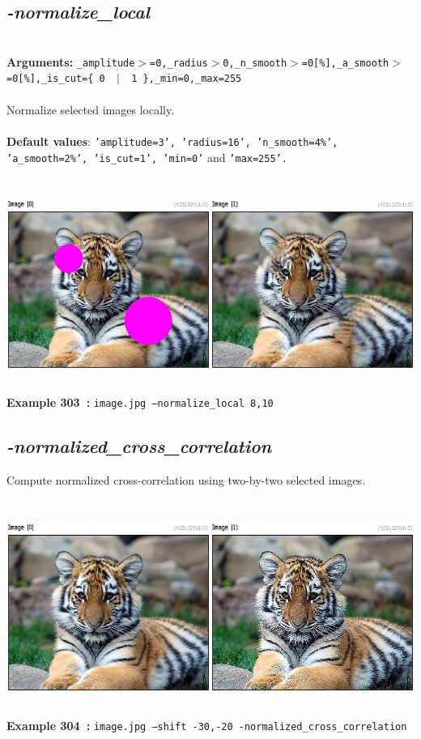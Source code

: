 \documentclass[a4paper,11pt,twoside]{book}
\begin{document}
\subsection{\emph{-normalize\_local} }\vspace*{-0.5em}
~\\\textbf{Arguments: } 
{\small \texttt{\_amplitude$>$=0,\_radius$>$0,\_n\_smooth$>$=0[\%],\_a\_smooth$>$=0[\%],\_is\_cut=\{ 0 ~$|$~ 1 \},\_min=0,\_max=255}}\\~\\
Normalize selected images locally.
~\\~\\\textbf{Default values}: {\small \texttt{'amplitude=3', 'radius=16', 'n\_smooth=4\%', 'a\_smooth=2\%', 'is\_cut=1', 'min=0'} and \texttt{'max=255'.}}
\begin{center}\includegraphics[keepaspectratio=true,height=7cm,width=\textwidth]{img/gmic_def303.jpg}\\
{\footnotesize \textbf{Example 303~:} \texttt{image.jpg --normalize\_local 8,10}}
\end{center}

\subsection{\emph{-normalized\_cross\_correlation} }\vspace*{-0.5em}
Compute normalized cross-correlation using two-by-two selected images.
\begin{center}\includegraphics[keepaspectratio=true,height=7cm,width=\textwidth]{img/gmic_def304.jpg}\\
{\footnotesize \textbf{Example 304~:} \texttt{image.jpg --shift -30,-20 -normalized\_cross\_correlation}}
\end{center}
\end{document}
